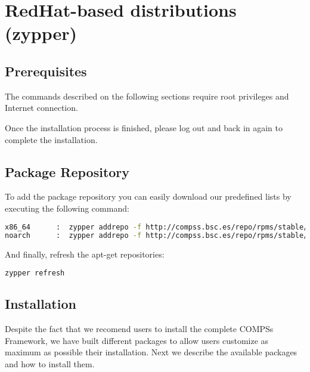 \section{RedHat-based distributions (zypper)}
\label{sec:RedHat_zypper}


\subsection{Prerequisites}
The commands described on the following sections require root privileges and Internet connection.

Once the installation process is finished, please log out and back in again to complete the installation. 

\subsection{Package Repository}
To add the package repository you can easily download our predefined lists by executing the following command:
\begin{lstlisting}[language=bash]
x86_64      :  zypper addrepo -f http://compss.bsc.es/repo/rpms/stable/suse/x86_64 compss
noarch      :  zypper addrepo -f http://compss.bsc.es/repo/rpms/stable/suse/noarch compss
\end{lstlisting}

And finally, refresh the apt-get repositories:
\begin{lstlisting}[language=bash]
zypper refresh
\end{lstlisting}

\subsection{Installation}
Despite the fact that we recomend users to install the complete COMPSs Framework, we have built different packages to allow users
customize as maximum as possible their installation. Next we describe the available packages and how to install them. 



